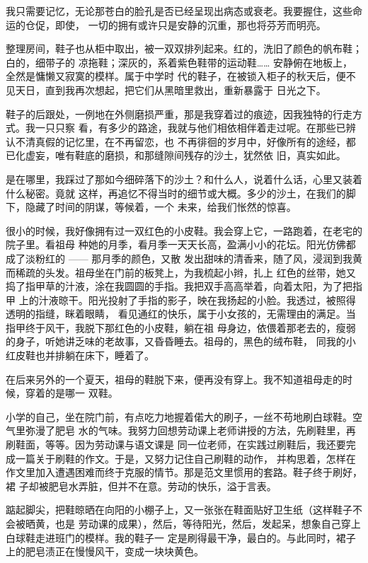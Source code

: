 		我只需要记忆，无论那苍白的脸孔是否已经呈现出病态或衰老。我要握住，这些命运的仓促，即使，
	一切的拥有或许只是安静的沉重，那也将芬芳而明亮。

	\endwriting



		整理房间，鞋子也从柜中取出，被一双双排列起来。红的，洗旧了颜色的帆布鞋；白的，细带子的
	凉拖鞋；深灰的，系着紫色鞋带的运动鞋…… 安静俯在地板上，全然是慵懒又寂寞的模样。属于中学时
	代的鞋子，在被锁入柜子的秋天后，便不见天日，直到我再次想起，把它们从黑暗里救出，重新暴露于
	日光之下。


		鞋子的后跟处，一例地在外侧磨损严重，那是我穿着过的痕迹，因我独特的行走方式。我一只只察
	看，有多少的路途，我就与他们相依相伴着走过呢。在那些已辨认不清真假的记忆里，在不再留恋，也
	不再徘徊的岁月中，好像所有的途经，都已化虚妄，唯有鞋底的磨损，和那缝隙间残存的沙土，犹然依
	旧，真实如此。

		是在哪里，我踩过了那如今细碎落下的沙土？和什么人，说着什么话，心里又装着什么秘密。竟就
	这样，再追忆不得当时的细节或大概。多少的沙土，在我们的脚下，隐藏了时间的阴谋，等候着，一个
	未来，给我们怅然的惊喜。


		很小的时候，我好像拥有过一双红色的小皮鞋。我会穿上它，一路跑着，在老宅的院子里。看祖母
	种她的月季，看月季一天天长高，盈满小小的花坛。阳光仿佛都成了淡粉红的 —— 那月季的颜色，又散
	发出甜味的清香来，随了风，浸润到我黄而稀疏的头发。祖母坐在门前的板凳上，为我梳起小辫，扎上
	红色的丝带，她又捣了指甲草的汁液，涂在我圆圆的手指。我把双手高高举着，向着太阳，为了把指甲
	上的汁液晾干。阳光投射了手指的影子，映在我扬起的小脸。我透过，被照得透明的指缝，眯着眼睛，
	看见通红的快乐，属于小女孩的，无需理由的满足。当指甲终于风干，我脱下那红色的小皮鞋，躺在祖
	母身边，依偎着那老去的，瘦弱的身子，听她讲乏味的老故事，又昏昏睡去。祖母的，黑色的绒布鞋，
	同我的小红皮鞋也并排躺在床下，睡着了。

		在后来另外的一个夏天，祖母的鞋脱下来，便再没有穿上。我不知道祖母走的时候，穿着的是哪一
	双鞋。

		小学的自己，坐在院门前，有点吃力地握着偌大的刷子，一丝不苟地刷白球鞋。空气里弥漫了肥皂
	水的气味。我努力回想劳动课上老师讲授的方法，先刷鞋里，再刷鞋面，等等。因为劳动课与语文课是
	同一位老师，在实践过刷鞋后，我还要完成一篇关于刷鞋的作文。于是，又努力记住自己刷鞋的动作，
	并构思着，怎样在作文里加入遭遇困难而终于克服的情节。那是范文里惯用的套路。鞋子终于刷好，裙
	子却被肥皂水弄脏，但并不在意。劳动的快乐，溢于言表。

		踮起脚尖，把鞋晾晒在向阳的小棚子上，又一张张在鞋面贴好卫生纸（这样鞋子不会被晒黄，也是
	劳动课的成果），然后，等待阳光，然后，发起呆，想象自己穿上白球鞋走进班门的模样。我的鞋子一
	定是刷得最干净，最白的。与此同时，裙子上的肥皂渍正在慢慢风干，变成一块块黄色。


